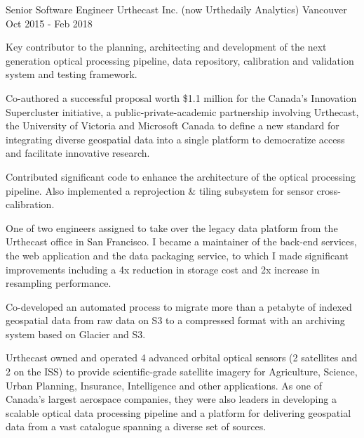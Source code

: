 \begin{cventries}
  \cventrywithsummary
    {Senior Software Engineer} %
    {Urthecast Inc. (now Urthedaily Analytics)} %
    {Vancouver} %
    {Oct 2015 - Feb 2018} %
    {
      \begin{cvitems} %
        \item {Key contributor to the planning, architecting and development of the next generation optical processing pipeline, data repository, calibration and validation system and testing framework.}
        \item {Co-authored a successful proposal worth \$1.1 million for the Canada's Innovation Supercluster initiative, a public-private-academic partnership involving Urthecast, the University of Victoria and Microsoft Canada to define a new standard for integrating diverse geospatial data into a single platform to democratize access and facilitate innovative research.}
        \item {Contributed significant code to enhance the architecture of the optical processing pipeline. Also implemented a reprojection \& tiling subsystem for sensor cross-calibration.}
        \item {One of two engineers assigned to take over the legacy data platform from the Urthecast office in San Francisco. I became a maintainer of the back-end services, the web application and the data packaging service, to which I made significant improvements including a 4x reduction in storage cost and 2x increase in resampling performance.}
        \item {Co-developed an automated process to migrate more than a petabyte of indexed geospatial data from raw data on S3 to a compressed format with an archiving system based on Glacier and S3.}
      \end{cvitems}
    }
    {
      Urthecast owned and operated 4 advanced orbital optical sensors (2 satellites and 2 on the ISS) to provide scientific-grade satellite imagery for Agriculture, Science, Urban Planning, Insurance, Intelligence and other applications. As one of Canada's largest aerospace companies, they were also leaders in developing a scalable optical data processing pipeline and a platform for delivering geospatial data from a vast catalogue spanning a diverse set of sources.
    }


\end{cventries}
